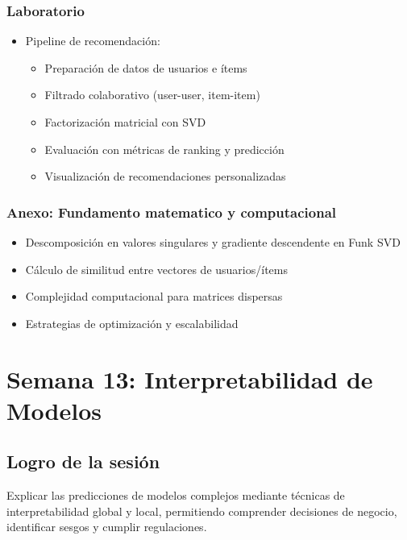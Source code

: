 \documentclass[12pt,a4paper,openany,oneside]{book}
\begin{document}
\begin{itemize}
\subsection{Laboratorio}
\begin{itemize}
    \item Pipeline de recomendación:
    \begin{itemize}
        \item Preparación de datos de usuarios e ítems
        \item Filtrado colaborativo (user-user, item-item)
        \item Factorización matricial con SVD
        \item Evaluación con métricas de ranking y predicción
        \item Visualización de recomendaciones personalizadas
    \end{itemize}
\end{itemize}

\subsection{Anexo: Fundamento matematico y computacional}
\begin{itemize}
    \item Descomposición en valores singulares y gradiente descendente en Funk SVD
    \item Cálculo de similitud entre vectores de usuarios/ítems
    \item Complejidad computacional para matrices dispersas
    \item Estrategias de optimización y escalabilidad
\end{itemize}
\chapter{Semana 13: Interpretabilidad de Modelos}

\section{Logro de la sesión}
Explicar las predicciones de modelos complejos mediante técnicas de interpretabilidad global y local, permitiendo comprender decisiones de negocio, identificar sesgos y cumplir regulaciones.


\end{itemize}
\end{document}
